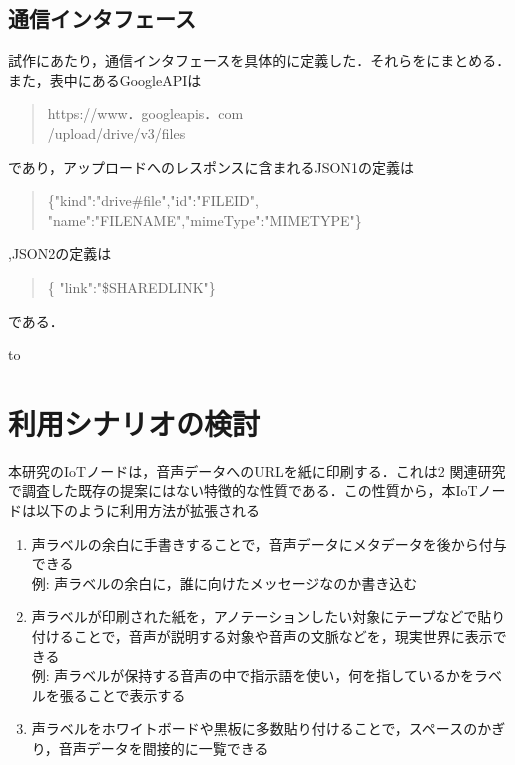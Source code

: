 \documentclass[submit,techrep,noauthor]{ipsj}
\begin{document}
\subsection{通信インタフェース}
試作にあたり，通信インタフェースを具体的に定義した．それらをにまとめる．また，表中にあるGoogleAPIは
\begin{quote}
    https://www．googleapis．com\\/upload/drive/v3/files
\end{quote}であり，アップロードへのレスポンスに含まれるJSON1の定義は\begin{quote}
    \{"kind":"drive\#file","id":"FILEID", "name":"FILENAME","mimeType":"MIMETYPE"\}
\end{quote},JSON2の定義は\begin{quote}
    \{ "link":"\$SHAREDLINK"\}
\end{quote}である．

\begin{table}[tb] 
\caption{試作物の通信インタフェース} 
\label{tab:proto-communication}
\hbox to
\end{table}

\section{利用シナリオの検討}
本研究のIoTノードは，音声データへのURLを紙に印刷する．これは2 関連研究で調査した既存の提案にはない特徴的な性質である．この性質から，本IoTノードは以下のように利用方法が拡張される
\begin{enumerate}
    \item 声ラベルの余白に手書きすることで，音声データにメタデータを後から付与できる\\例: 声ラベルの余白に，誰に向けたメッセージなのか書き込む
    \item 声ラベルが印刷された紙を，アノテーションしたい対象にテープなどで貼り付けることで，音声が説明する対象や音声の文脈などを，現実世界に表示できる\cite{cyber} \\例: 声ラベルが保持する音声の中で指示語を使い，何を指しているかをラベルを張ることで表示する
    \item 声ラベルをホワイトボードや黒板に多数貼り付けることで，スペースのかぎり，音声データを間接的に一覧できる
\end{enumerate}
\end{document}
